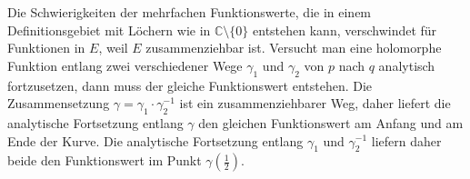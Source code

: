 Die Schwierigkeiten der mehrfachen Funktionswerte, die in einem
Definitionsgebiet mit Löchern wie in $\mathbb{C}\setminus\{0\}$
entstehen kann, verschwindet für Funktionen in $E$, weil $E$ 
zusammenziehbar ist.
Versucht man eine holomorphe Funktion entlang zwei verschiedener
Wege $\gamma_1$ und $\gamma_2$ von $p$ nach $q$ analytisch fortzusetzen,
dann muss der gleiche Funktionswert entstehen.
Die Zusammensetzung $\gamma=\gamma_1\cdot\gamma_2^{-1}$ ist ein
zusammenziehbarer Weg, daher liefert die analytische Fortsetzung
entlang $\gamma$ den gleichen Funktionswert am Anfang und am Ende
der Kurve.
Die analytische Fortsetzung entlang $\gamma_1$ und $\gamma_2^{-1}$ 
liefern daher beide den Funktionswert im Punkt $\gamma(\frac12)$.












